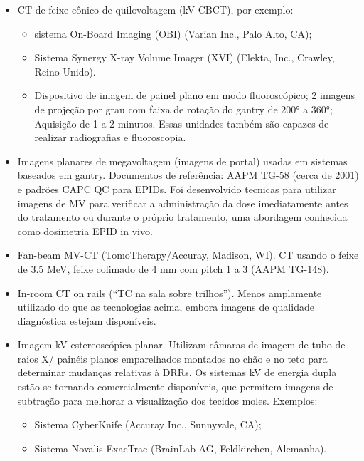 \documentclass[11pt,a4paper]{article}
\newcounter{exemplo}
\begin{document}
    \begin{itemize}[label=\textcolor{CarnationPink}{$\blacktriangleright$}]
        \item  CT de feixe cônico de quilovoltagem (kV-CBCT), por exemplo:
        \begin{itemize}[label=\textcolor{CarnationPink}{$\star$}]
            \item sistema On-Board Imaging (OBI) (Varian Inc., Palo Alto, CA);
            \item Sistema Synergy X-ray Volume Imager (XVI) (Elekta, Inc., Crawley, Reino Unido).
            \item  Dispositivo de imagem de painel plano em modo fluoroscópico; 2 imagens de projeção por grau com faixa de rotação do gantry de \ang{200} a \ang{360}; Aquisição de 1 a 2 minutos. Essas unidades também são capazes de realizar radiografias e fluoroscopia.
        \end{itemize}
        
        \item Imagens planares de megavoltagem (imagens de portal) usadas em sistemas baseados em gantry. Documentos de referência: AAPM TG-58 (cerca de 2001) e padrões CAPC QC para EPIDs. Foi desenvolvido tecnicas para utilizar imagens de MV para verificar a administração da dose imediatamente antes do tratamento ou durante o próprio tratamento, uma abordagem conhecida como dosimetria EPID in vivo.
        
        \item Fan-beam MV-CT (TomoTherapy/Accuray, Madison, WI). CT usando o feixe de 3.5 MeV, feixe colimado de 4 mm com pitch 1 a 3 (AAPM TG-148).
        
        \item In-room CT on rails (``TC na sala sobre trilhos''). Menos amplamente utilizado do que as tecnologias acima, embora imagens de qualidade diagnóstica estejam disponíveis. 
        
        \item Imagem kV estereoscópica planar. Utilizam câmaras de imagem de tubo de raios X/ painéis planos emparelhados montados no chão e no teto para determinar mudanças relativas à DRRs. Os sistemas kV de energia dupla estão se tornando comercialmente disponíveis, que permitem imagens de subtração para melhorar a visualização dos tecidos moles. Exemplos:
        \begin{itemize}[label=\textcolor{CarnationPink}{$\star$}]
            \item Sistema CyberKnife (Accuray Inc., Sunnyvale, CA);
            \item Sistema Novalis ExacTrac (BrainLab AG, Feldkirchen, Alemanha).
        \end{itemize}
        

\end{itemize}
\end{document}
